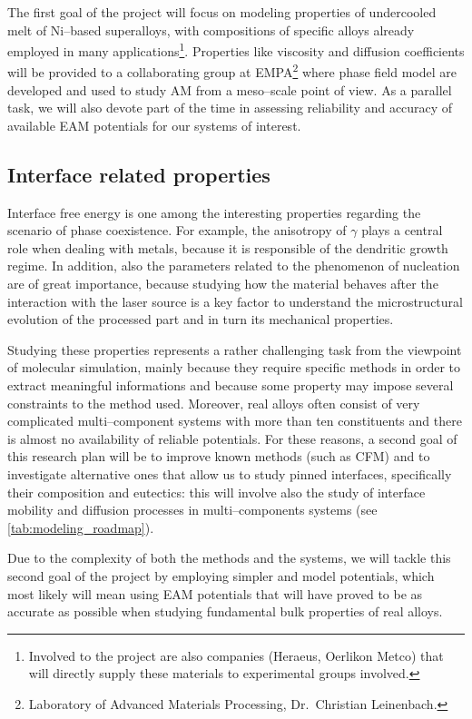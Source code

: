 The first goal of the project will focus on modeling properties of undercooled melt of Ni--based superalloys, with compositions of specific alloys already employed in many applications\footnote{Involved to the project are also companies (Heraeus, Oerlikon Metco) that will directly supply these materials to experimental groups involved.}. Properties like viscosity and diffusion coefficients will be provided to a collaborating group at EMPA\footnote{Laboratory of Advanced Materials Processing, Dr.~Christian Leinenbach.} where phase field model are developed and used to study AM from a meso--scale point of view.
As a parallel task, we will also devote part of the time in assessing reliability and accuracy of available EAM potentials for our systems of interest.



\subsection{Interface related properties}

Interface free energy is one among the interesting properties regarding the scenario of phase coexistence. For example, the anisotropy of $\gamma$ plays a central role when dealing with metals, because it is responsible of the dendritic growth regime. In addition, also the parameters related to the phenomenon of nucleation are of great importance, because studying how the material behaves after the interaction with the laser source is a key factor to understand the microstructural evolution of the processed part and in turn its mechanical properties.

Studying these properties represents a rather challenging task from the viewpoint of molecular simulation, mainly because they require specific methods in order to extract meaningful informations and because some property may impose several constraints to the method used. Moreover, real alloys often consist of very complicated multi--component systems with more than ten constituents and there is almost no availability of reliable potentials. For these reasons, a second goal of this research plan will be to improve known methods (such as CFM) and to investigate alternative ones that allow us to study pinned interfaces, specifically their composition and eutectics: this will involve also the study of interface mobility and diffusion processes in multi--components systems (see \cref{tab:modeling_roadmap}).

Due to the complexity of both the methods and the systems, we will tackle this second goal of the project by employing simpler and model potentials, which most likely will mean using EAM potentials that will have proved to be as accurate as possible when studying fundamental bulk properties of real alloys.




